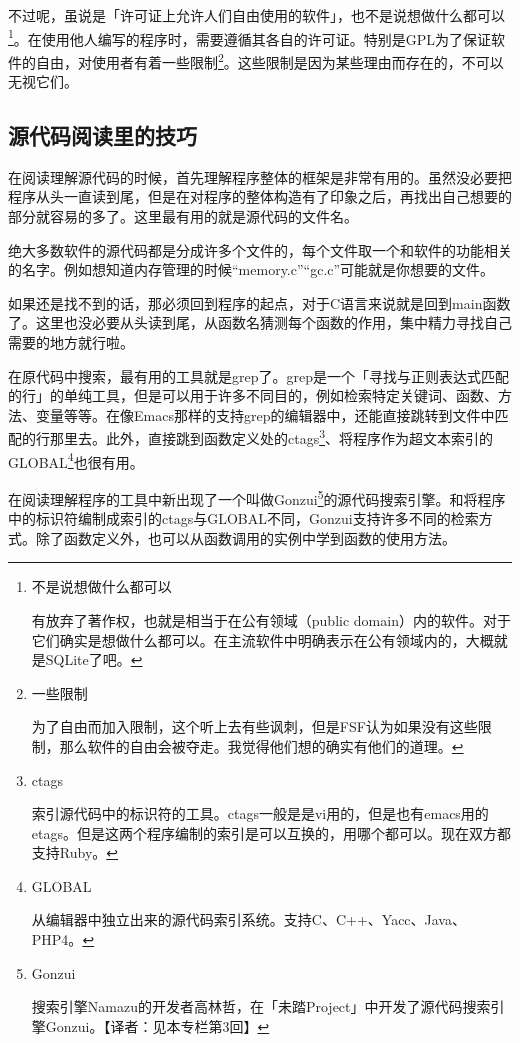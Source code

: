 \documentclass[a4paper,12pt]{article}
\begin{document}
不过呢，虽说是「许可证上允许人们自由使用的软件」，也不是说想做什么都可以\footnote{不是说想做什么都可以

  有放弃了著作权，也就是相当于在公有领域（public domain）内的软件。对于它们确实是想做什么都可以。在主流软件中明确表示在公有领域内的，大概就是SQLite了吧。}。在使用他人编写的程序时，需要遵循其各自的许可证。特别是GPL为了保证软件的自由，对使用者有着一些限制\footnote{一些限制

为了自由而加入限制，这个听上去有些讽刺，但是FSF认为如果没有这些限制，那么软件的自由会被夺走。我觉得他们想的确实有他们的道理。}。这些限制是因为某些理由而存在的，不可以无视它们。

\subsection{源代码阅读里的技巧}

在阅读理解源代码的时候，首先理解程序整体的框架是非常有用的。虽然没必要把程序从头一直读到尾，但是在对程序的整体构造有了印象之后，再找出自己想要的部分就容易的多了。这里最有用的就是源代码的文件名。

绝大多数软件的源代码都是分成许多个文件的，每个文件取一个和软件的功能相关的名字。例如想知道内存管理的时候“memory.c”“gc.c”可能就是你想要的文件。

如果还是找不到的话，那必须回到程序的起点，对于C语言来说就是回到main函数了。这里也没必要从头读到尾，从函数名猜测每个函数的作用，集中精力寻找自己需要的地方就行啦。

在原代码中搜索，最有用的工具就是grep了。grep是一个「寻找与正则表达式匹配的行」的单纯工具，但是可以用于许多不同目的，例如检索特定关键词、函数、方法、变量等等。在像Emacs那样的支持grep的编辑器中，还能直接跳转到文件中匹配的行那里去。此外，直接跳到函数定义处的ctags\footnote{ctags

  索引源代码中的标识符的工具。ctags一般是是vi用的，但是也有emacs用的etags。但是这两个程序编制的索引是可以互换的，用哪个都可以。现在双方都支持Ruby。}、将程序作为超文本索引的GLOBAL\footnote{GLOBAL

  从编辑器中独立出来的源代码索引系统。支持C、C++、Yacc、Java、PHP4。}也很有用。

在阅读理解程序的工具中新出现了一个叫做Gonzui\footnote{Gonzui

  搜索引擎Namazu的开发者高林哲，在「未踏Project」中开发了源代码搜索引擎Gonzui。【译者：见本专栏第3回】}的源代码搜索引擎。和将程序中的标识符编制成索引的ctags与GLOBAL不同，Gonzui支持许多不同的检索方式。除了函数定义外，也可以从函数调用的实例中学到函数的使用方法。
\end{document}
